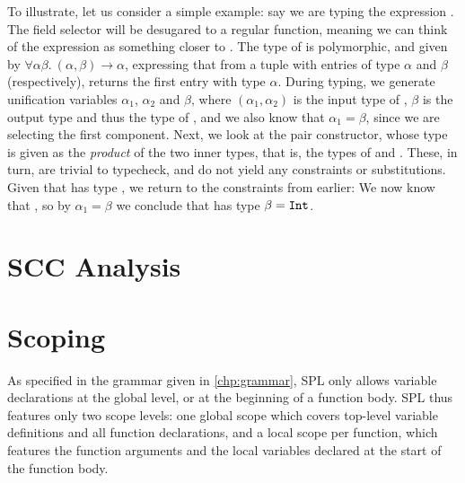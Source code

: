 
To illustrate, let us consider a simple example: say we are typing the
expression . The field selector  will be desugared
to a regular function, meaning we can think of the expression as something
closer to . The type of  is polymorphic, and
given by $\forall \alpha \beta.\ (\alpha,\beta) \to \alpha$, expressing that
from a tuple with entries of type $\alpha$ and $\beta$ (respectively),
 returns the first entry with type $\alpha$.
During typing, we generate unification variables $\alpha_1$, $\alpha_2$ and
$\beta$, where $(\alpha_1,\alpha_2)$ is the input type of , $\beta$
is the output type and thus the type of , and we also know
that $\alpha_1 = \beta$, since we are selecting the first component.
Next, we look at the pair constructor, whose type is given as the \emph{product}
of the two inner types, that is, the types of  and .
These, in turn, are trivial to typecheck, and do not yield any constraints or
substitutions. Given that  has type , we return
to the constraints from earlier:
We now know that , so by
$\alpha_1 = \beta$ we conclude that  has type
$\beta = \texttt{Int}$.





\section{SCC Analysis}



\section{Scoping}
As specified in the grammar given in \cref{chp:grammar}, SPL only allows
variable declarations at the global level, or at the beginning of a function
body. SPL thus features only two scope levels: one global scope which covers
top-level variable definitions and all function declarations, and a local scope
per function, which features the function arguments and the local variables
declared at the start of the function body.

